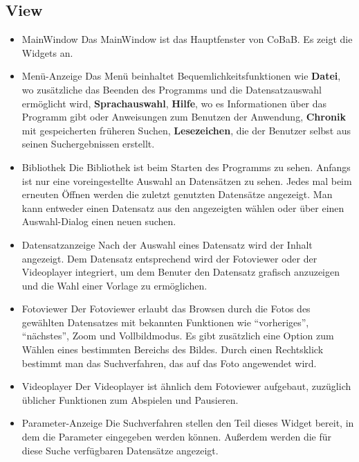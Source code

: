 \subsection{View}
\begin{itemize}
\item MainWindow \newLine
Das MainWindow ist das Hauptfenster von CoBaB. Es zeigt die Widgets an.

\item Menü-Anzeige \newline
Das Menü beinhaltet Bequemlichkeitsfunktionen wie \textbf{Datei}, wo zusätzliche das Beenden des Programms und die Datensatzauswahl ermöglicht wird, \textbf{Sprachauswahl}, \textbf{Hilfe}, wo es Informationen über das Programm gibt oder Anweisungen zum Benutzen der Anwendung, \textbf{Chronik} mit gespeicherten früheren Suchen, \textbf{Lesezeichen}, die der Benutzer selbst aus seinen Suchergebnissen erstellt.

\item Bibliothek \newline
Die Bibliothek ist beim Starten des Programms zu sehen. Anfangs ist nur eine voreingestellte Auswahl an Datensätzen zu sehen. Jedes mal beim erneuten Öffnen werden die zuletzt genutzten Datensätze angezeigt. Man kann entweder einen Datensatz aus den angezeigten wählen oder über einen Auswahl-Dialog einen neuen suchen.

\item Datensatzanzeige \newline
Nach der Auswahl eines Datensatz wird der Inhalt angezeigt. Dem Datensatz entsprechend wird der Fotoviewer oder der Videoplayer integriert, um dem Benuter den Datensatz grafisch anzuzeigen und die Wahl einer Vorlage zu ermöglichen.

\item Fotoviewer \newline
Der Fotoviewer erlaubt das Browsen durch die Fotos des gewählten Datensatzes mit bekannten Funktionen wie \enquote{vorheriges}, \enquote{nächstes}, Zoom und Vollbildmodus. Es gibt zusätzlich eine Option zum Wählen eines bestimmten Bereichs des Bildes. Durch einen Rechtsklick bestimmt man das Suchverfahren, das auf das Foto angewendet wird.

\item Videoplayer \newline
Der Videoplayer ist ähnlich dem Fotoviewer aufgebaut, zuzüglich üblicher Funktionen zum Abspielen und Pausieren.

\item Parameter-Anzeige \newline
Die Suchverfahren stellen den Teil dieses Widget bereit, in dem die Parameter eingegeben werden können. Außerdem werden die für diese Suche verfügbaren Datensätze angezeigt.


\end{itemize}
